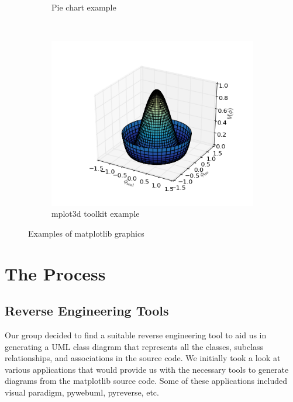 \documentclass[pdftex,10pt,a4paper]{report}
\begin{document}
\begin{figure}
\begin{subfigure}[b]{0.3\textwidth}
                \caption{Pie chart example}
                \label{fig:pie}
        \end{subfigure}
        ~ %
        \begin{subfigure}[b]{0.3\textwidth}
                \includegraphics[width=\textwidth]{img/examples/mplot3d}
                \caption{mplot3d toolkit example}
                \label{fig:mplot3d}
        \end{subfigure}
        \caption{Examples of matplotlib graphics}\label{fig:examples}
\end{figure}




\chapter{The Process}

\section{Reverse Engineering Tools}

Our group decided to find a suitable reverse engineering tool to aid us in generating a UML class diagram that represents all the classes, subclass relationships, and associations in the source code. We initially took a look at various applications that would provide us with the necessary tools to generate diagrams from the matplotlib source code. Some of these applications included visual paradigm, pywebuml, pyreverse, etc. 
\end{document}
